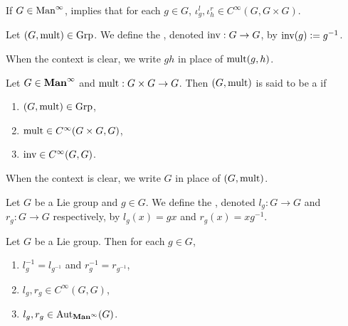 \documentclass{book}
\begin{document}
\begin{note} 
	If $G \in \text{Man}^{\infty}$,  implies that for each $g \in G$, $\iota^l_g, \iota^r_h \in C^{\infty}(G, G \times G)$. 
\end{note}

\begin{defn}
	Let $(G, \text{mult}) \in \text{Grp}$. We define the , denoted $\text{inv}: G \rightarrow G$, by $\text{inv}(g) \vcentcolon= g^{-1}$.
\end{defn}

\begin{note}
	When the context is clear, we write $gh$ in place of $\text{mult}(g,h)$.
\end{note}

\begin{defn}
	Let $G \in \operatorname*{\text{\textbf{Man}}^{\infty}}$ and $\text{mult}:G \times G \rightarrow G$. Then $(G, \text{mult})$ is said to be a  if 
	\begin{enumerate}
		\item $(G, \text{mult}) \in \text{Grp}$,
		\item $\text{mult} \in  C^{\infty}(G \times G, G)$,
		\item $\text{inv} \in  C^{\infty}(G, G)$.
	\end{enumerate}
\end{defn}

\begin{note}
	When the context is clear, we write $G$ in place of $(G, \text{mult})$.
\end{note}

\begin{defn} 
	Let $G$ be a Lie group and $g \in G$. We define the , denoted $l_g:G \rightarrow G$ and $r_g:G \rightarrow G$ respectively, by $l_g(x) = gx$ and $r_g(x) = xg^{-1}$. 
\end{defn}

\begin{ex} 
	Let $G$ be a Lie group. Then for each $g \in G$, 
	\begin{enumerate}
		\item $l_g^{-1} = l_{g^{-1}}$ and $r_g^{-1} = r_{g^{-1}}$,
		\item $l_g, r_g \in  C^{\infty}(G, G)$,
		\item $l_g, r_g \in \operatorname{Aut}_{\operatorname*{\text{\textbf{Man}}^{\infty}}}(G)$. 
	\end{enumerate}
\end{ex}
\end{document}
